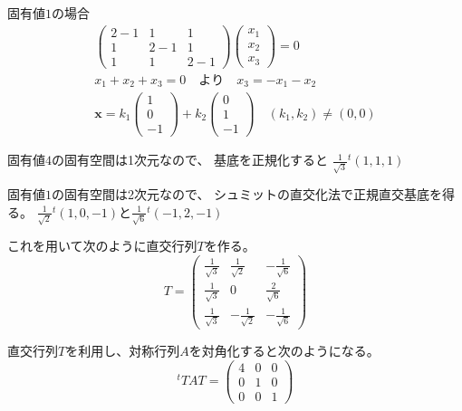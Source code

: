 \documentclass[10pt,b5paper]{ltjsarticle}
\begin{document}
\begin{enumerate}
       固有値$1$の場合
       \begin{gather}
        \begin{pmatrix}
         2-1 & 1 & 1\\
         1 & 2-1 & 1\\
         1 & 1 & 2-1
        \end{pmatrix}
        \begin{pmatrix}
         x_1\\x_2\\x_3
        \end{pmatrix}
        =0\\
        x_1+x_2+x_3=0 \quad より \quad
        x_3=-x_1-x_2\\
        \bm{x}=k_1\begin{pmatrix}1\\0\\-1\end{pmatrix}
        +k_2\begin{pmatrix}0\\1\\-1\end{pmatrix}
        \quad (k_1,k_2)\ne(0,0)
       \end{gather}

       固有値$4$の固有空間は1次元なので、
       基底を正規化すると $\frac{1}{\sqrt{3}}{}^t(1, 1, 1)$

       固有値$1$の固有空間は2次元なので、
       シュミットの直交化法で正規直交基底を得る。
       $\frac{1}{\sqrt{2}}{}^t(1, 0, -1)$と$\frac{1}{\sqrt{6}}{}^t(-1, 2, -1)$

       これを用いて次のように直交行列$T$を作る。
       \begin{equation}
        T=
        \begin{pmatrix}
         \frac{1}{\sqrt{3}} & \frac{1}{\sqrt{2}} & -\frac{1}{\sqrt{6}}\\
         \frac{1}{\sqrt{3}} & 0 &\frac{2}{\sqrt{6}}\\
         \frac{1}{\sqrt{3}} & -\frac{1}{\sqrt{2}} & -\frac{1}{\sqrt{6}}
        \end{pmatrix}
       \end{equation}

       直交行列$T$を利用し、対称行列$A$を対角化すると次のようになる。
       \begin{equation}
        {}^tTAT =
         \begin{pmatrix}
          4 & 0 & 0\\
          0 & 1 & 0\\
          0 & 0 & 1
         \end{pmatrix}
       \end{equation}
       

\end{enumerate}
\end{document}
